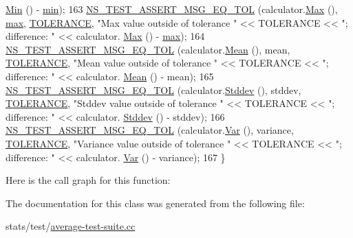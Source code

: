 \begin{DoxyCode}
      \hyperlink{classns3_1_1Average_a4649e7990b939fc55360312ac4ab6828}{Min} () - \hyperlink{80211b_8c_ac6afabdc09a49a433ee19d8a9486056d}{min});
163   \hyperlink{group__testing_ga9e7861b56b4e70db3b56044cb7a28e41}{NS\_TEST\_ASSERT\_MSG\_EQ\_TOL} (calculator.\hyperlink{classns3_1_1Average_a259a45edf08a70e46c79c627944ff9af}{Max} (), \hyperlink{80211b_8c_affe776513b24d84b39af8ab0930fef7f}{max}, 
      \hyperlink{average-test-suite_8cc_a89311a98397f9d6967d2cb10d5152d77}{TOLERANCE}, \textcolor{stringliteral}{"Max value outside of tolerance "} << TOLERANCE << \textcolor{stringliteral}{"; difference: "} << calculator.
      \hyperlink{classns3_1_1Average_a259a45edf08a70e46c79c627944ff9af}{Max} () - \hyperlink{80211b_8c_affe776513b24d84b39af8ab0930fef7f}{max});
164   \hyperlink{group__testing_ga9e7861b56b4e70db3b56044cb7a28e41}{NS\_TEST\_ASSERT\_MSG\_EQ\_TOL} (calculator.\hyperlink{classns3_1_1Average_a750277f678abfdc0184d697238975b93}{Mean} (), mean, 
      \hyperlink{average-test-suite_8cc_a89311a98397f9d6967d2cb10d5152d77}{TOLERANCE}, \textcolor{stringliteral}{"Mean value outside of tolerance "} << TOLERANCE << \textcolor{stringliteral}{"; difference: "} << calculator.
      \hyperlink{classns3_1_1Average_a750277f678abfdc0184d697238975b93}{Mean} () - mean);
165   \hyperlink{group__testing_ga9e7861b56b4e70db3b56044cb7a28e41}{NS\_TEST\_ASSERT\_MSG\_EQ\_TOL} (calculator.\hyperlink{classns3_1_1Average_ac7536c397973130662606c1019049503}{Stddev} (), stddev, 
      \hyperlink{average-test-suite_8cc_a89311a98397f9d6967d2cb10d5152d77}{TOLERANCE}, \textcolor{stringliteral}{"Stddev value outside of tolerance "} << TOLERANCE << \textcolor{stringliteral}{"; difference: "} << calculator.
      \hyperlink{classns3_1_1Average_ac7536c397973130662606c1019049503}{Stddev} () - stddev);
166   \hyperlink{group__testing_ga9e7861b56b4e70db3b56044cb7a28e41}{NS\_TEST\_ASSERT\_MSG\_EQ\_TOL} (calculator.\hyperlink{classns3_1_1Average_af81b1dec6bcafabf4ed63f43fdd8f568}{Var} (), variance, 
      \hyperlink{average-test-suite_8cc_a89311a98397f9d6967d2cb10d5152d77}{TOLERANCE}, \textcolor{stringliteral}{"Variance value outside of tolerance "} << TOLERANCE << \textcolor{stringliteral}{"; difference: "} << calculator.
      \hyperlink{classns3_1_1Average_af81b1dec6bcafabf4ed63f43fdd8f568}{Var} () - variance);
167 \}
\end{DoxyCode}


Here is the call graph for this function\+:




The documentation for this class was generated from the following file\+:\begin{DoxyCompactItemize}
\item 
stats/test/\hyperlink{average-test-suite_8cc}{average-\/test-\/suite.\+cc}\end{DoxyCompactItemize}

